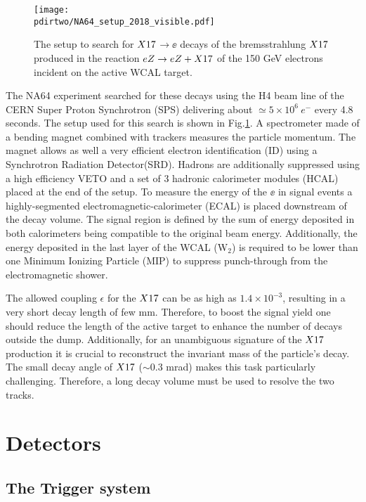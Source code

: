 \begin{figure}[tb]
\centering
\texttt{[image: \\pdirtwo/NA64\_setup\_2018\_visible.pdf]}
\caption[NA64 visible mode setup 2018]{The setup to search for $X17$$\to \ee$  decays of the bremsstrahlung $X17$ produced in the reaction
$eZ \to eZ+X17 $ of the 150 GeV electrons incident on the active WCAL target.}
\label{fig:setup-2018}
\end{figure}

The NA64 experiment searched for these decays using the H4 beam line of the CERN Super Proton Synchrotron (SPS) delivering about  $\simeq 5\times 10^6~e^-$ every 4.8 seconds. The setup used for this search is shown in Fig.\ref{fig:setup-2018}. A spectrometer made of a bending magnet combined with trackers measures the particle momentum. The magnet allows as well a very efficient electron identification (ID) using a Synchrotron Radiation Detector(SRD). Hadrons are additionally suppressed using a high efficiency VETO and a set of 3 hadronic calorimeter modules (HCAL) placed at the end of the setup. To measure the energy of the $\ee$ in signal events a highly-segmented electromagnetic-calorimeter (ECAL) is placed downstream of the decay volume. The signal region is defined by the sum of energy deposited in both calorimeters being compatible to the original beam energy. Additionally, the energy deposited in the last layer of the WCAL (W$_2$) is required to be lower than one Minimum Ionizing Particle (MIP) to suppress punch-through from the electromagnetic shower.

The allowed coupling $\epsilon$ for the $X17$ can be as high as $1.4 \times 10^{-3}$, resulting in a very short decay length of few mm. Therefore, to boost the signal yield one should reduce the length of the active target to enhance the number of decays outside the dump. Additionally, for an unambiguous signature of the $X17$ production it is crucial to reconstruct the invariant mass of the particle's decay. The small decay angle of $X17$ ($\sim$0.3 mrad) makes this task particularly challenging. Therefore, a long decay volume must be used to resolve the two tracks.

\section{Detectors}
\label{chapter2:sec:detectors}

\subsection{The Trigger system}
\label{chapter2:sec:detectors-trigger}

